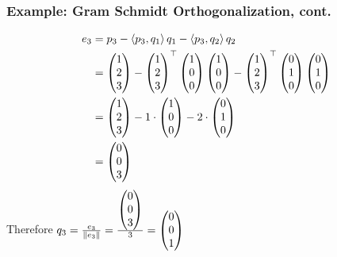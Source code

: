 \documentclass{beamer}
\begin{document}
\begin{frame}\frametitle{Example: Gram Schmidt Orthogonalization, cont.}

\begin{align*}
e_3 &= p_3 - \left<p_3, q_1\right> q_1 -\left<p_3, q_2\right>q_2 \\
    &= \begin{pmatrix} 1 \\ 2 \\ 3 \end{pmatrix} - \begin{pmatrix} 1\\2\\3\end{pmatrix}^\top\begin{pmatrix}1\\0\\0\end{pmatrix}\begin{pmatrix}1\\0\\0\end{pmatrix} - \begin{pmatrix} 1\\2\\3\end{pmatrix}^\top\begin{pmatrix}0\\1\\0\end{pmatrix}\begin{pmatrix}0\\1\\0\end{pmatrix} \\
    &= \begin{pmatrix} 1 \\ 2 \\ 3 \end{pmatrix} - 1\cdot\begin{pmatrix}1\\0\\0\end{pmatrix}  - 2\cdot\begin{pmatrix}0\\1\\0\end{pmatrix} \\
    &= \begin{pmatrix}0\\0\\3\end{pmatrix}
\end{align*}
Therefore
\(
q_3 = \frac{e_3}{\left\|e_3\right\|} = \frac{\begin{pmatrix}0\\0\\3\end{pmatrix}}{3} = \begin{pmatrix}0\\0\\1\end{pmatrix}
\)

\end{frame}
\end{document}
